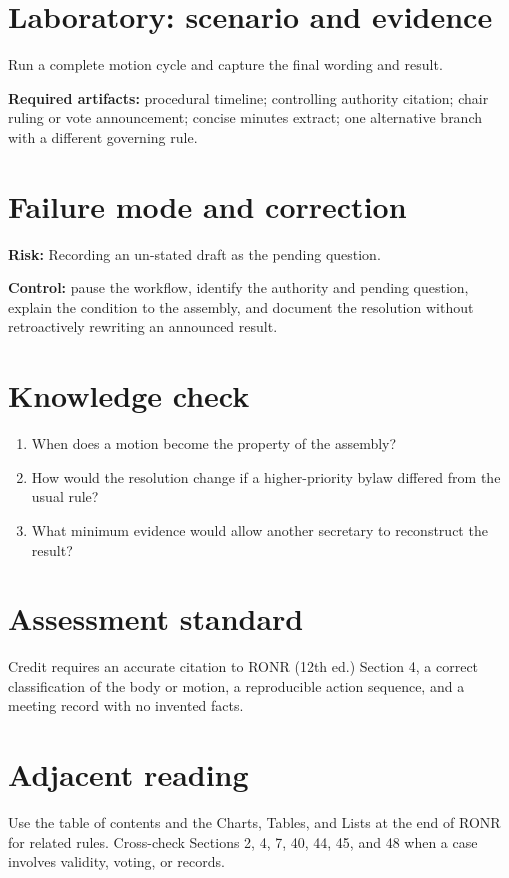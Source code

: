 \documentclass[11pt]{article}
\begin{document}
\section{Laboratory: scenario and evidence}
Run a complete motion cycle and capture the final wording and result.

\textbf{Required artifacts:} procedural timeline; controlling authority citation; chair ruling or vote announcement; concise minutes extract; one alternative branch with a different governing rule.

\section{Failure mode and correction}
\textbf{Risk:} Recording an un-stated draft as the pending question.

\textbf{Control:} pause the workflow, identify the authority and pending question, explain the condition to the assembly, and document the resolution without retroactively rewriting an announced result.

\section{Knowledge check}
\begin{enumerate}[leftmargin=*,itemsep=4pt]
\item When does a motion become the property of the assembly?
\item How would the resolution change if a higher-priority bylaw differed from the usual rule?
\item What minimum evidence would allow another secretary to reconstruct the result?
\end{enumerate}

\section{Assessment standard}
Credit requires an accurate citation to RONR (12th ed.) Section 4, a correct classification of the body or motion, a reproducible action sequence, and a meeting record with no invented facts.

\section{Adjacent reading}
Use the table of contents and the Charts, Tables, and Lists at the end of RONR for related rules. Cross-check Sections 2, 4, 7, 40, 44, 45, and 48 when a case involves validity, voting, or records.
\end{document}

